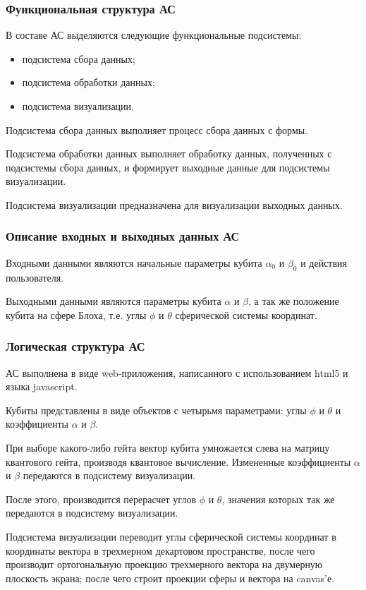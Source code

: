 \documentclass[12pt,pdf]{beamer}
\renewcommand{\~}[1]{\widetilde{#1}}
\begin{document}
  \begin{frame}
    \frametitle{Функциональная структура АС}
    В составе АС выделяются следующие функциональные подсистемы:
    \begin{itemize}
      \item подсистема сбора данных;
      \item подсистема обработки данных;
      \item подсистема визуализации.
    \end{itemize}
    
    Подсистема сбора данных выполняет процесс сбора данных с формы.
    
    Подсистема обработки данных выполняет обработку данных, полученных с
    подсистемы сбора данных, и формирует выходные данные для подсистемы
    визуализации.
    
    Подсистема визуализации предназначена для визуализации выходных данных.
  \end{frame}
  
  \begin{frame}
    \frametitle{Описание входных и выходных данных АС}
    Входными данными являются начальные параметры кубита \( \alpha_0 \) и
    \( \beta_0 \) и действия пользователя.
    \vspace{1ex}
    
    Выходными данными являются параметры кубита \( \alpha \) и \( \beta \),
    а так же положение кубита на сфере Блоха, т.е. углы \( \phi \) и
    \( \theta \) сферической системы координат.
  \end{frame}
  
  \begin{frame}
    \frametitle{Логическая структура АС}
    \small
    АС выполнена в виде web-приложения, написанного с использованием
    html5 и языка javascript.
    
    Кубиты представлены в виде объектов с четырьмя параметрами: углы \( \phi \)
    и \( \theta \) и коэффициенты \( \alpha \) и \( \beta \).
    
    При выборе какого-либо гейта вектор кубита умножается слева на матрицу
    квантового гейта, производя квантовое вычисление. Измененные коэффициенты
    \( \alpha \) и \( \beta \) передаются в подсистему визуализации.
    
    После этого, производится перерасчет углов \( \phi \) и \( \theta \),
    значения которых так же передаются в подсистему визуализации.
    
    Подсистема визуализации переводит углы сферической системы координат в
    координаты вектора в трехмерном декартовом пространстве, после чего
    производит ортогональную проекцию трехмерного вектора на двумерную
    плоскость экрана; после чего строит проекции сферы и вектора на canvas'е.
  \end{frame}
\end{document}
